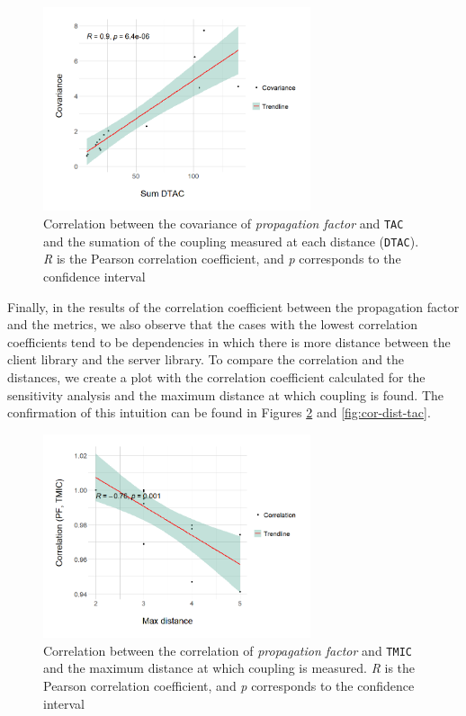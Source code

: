 \begin{figure}[ht!]
\begin{center}
\includegraphics[width=0.7\textwidth]{figures/results/covariance-values-tac.png}
\caption{Correlation between the covariance of \textit{propagation factor} and \texttt{TAC} and the sumation of the coupling measured at each distance (\texttt{DTAC}). \textit{R} is the Pearson correlation coefficient, and \textit{p} corresponds to the confidence interval}
\label{fig:cov-value-tac}
\end{center}
\end{figure}

Finally, in the results of the correlation coefficient between the propagation factor and the metrics, we also observe that the cases with the lowest correlation coefficients tend to be dependencies in which there is more distance between the client library and the server library. To compare the correlation and the distances, we create a plot with the correlation coefficient calculated for the sensitivity analysis and the maximum distance at which coupling is found. The confirmation of this intuition can be found in Figures \ref{fig:cor-dist-tmic} and \ref{fig:cor-dist-tac}.

\begin{figure}[ht!]
\begin{center}
\includegraphics[width=0.7\textwidth]{figures/results/correlation_max_distance_TMIC.png}
\caption{Correlation between the correlation of \textit{propagation factor} and \texttt{TMIC} and the maximum distance at which coupling is measured. \textit{R} is the Pearson correlation coefficient, and \textit{p} corresponds to the confidence interval}
\label{fig:cor-dist-tmic}
\end{center}
\end{figure}

